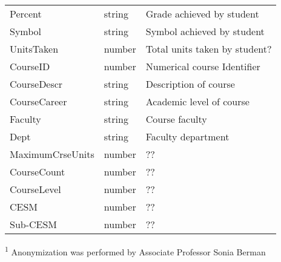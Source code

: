 \begin{table}[H]
\begin{threeparttable}
\begin{tabularx}{\textwidth}{>{\hsize=0.8\hsize}X>{\hsize=0.6\hsize}X>{\hsize=1.6\hsize}X}
            Percent            & string            & Grade achieved by student                            \\
            Symbol             & string            & Symbol achieved by student                           \\
            UnitsTaken         & number            & Total units taken by student?                        \\
            CourseID           & number            & Numerical course Identifier                          \\
            CourseDescr        & string            & Description of course                                \\
            CourseCareer       & string            & Academic level of course                             \\
            Faculty            & string            & Course faculty                                       \\
            Dept               & string            & Faculty department                                   \\
            MaximumCrseUnits   & number            & ??                                                   \\
            CourseCount        & number            & ??                                                   \\
            CourseLevel        & number            & ??                                                   \\
            CESM               & number            & ??                                                   \\
            Sub-CESM           & number            & ??                                                   \\
            \bottomrule
        \end{tabularx}
        \scriptsize
        \begin{tablenotes}
            \item[\textsuperscript{1}]Anonymization was performed by Associate Professor Sonia Berman
        \end{tablenotes}
    \end{threeparttable}
\end{table}


